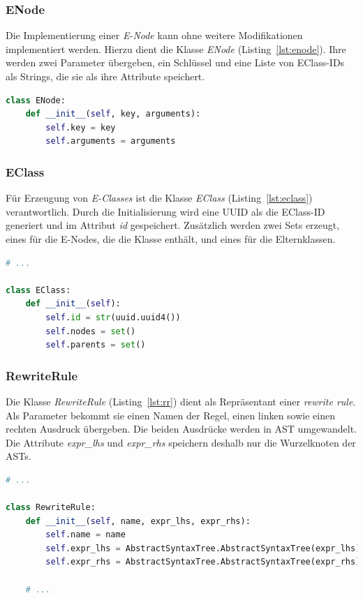 \subsubsection{ENode}

Die Implementierung einer \textit{E-Node} kann ohne weitere Modifikationen implementiert werden. Hierzu dient die Klasse \textit{ENode} (Listing~\ref{lst:enode}).
Ihre werden zwei Parameter übergeben, ein Schlüssel und eine Liste von EClass-IDs als Strings, die sie als ihre Attribute speichert.

\begin{lstlisting}[language=Python, caption=Klasse \textit{ENode}, label={lst:enode}]
class ENode:
    def __init__(self, key, arguments):
        self.key = key
        self.arguments = arguments
\end{lstlisting}

\subsubsection{EClass}

Für Erzeugung von \textit{E-Classes} ist die Klasse \textit{EClass} (Listing~\ref{lst:eclass}) verantwortlich. Durch die Initialisierung wird eine UUID als die EClass-ID generiert 
und im Attribut \textit{id} gespeichert. Zusätzlich werden zwei Sets erzeugt, eines für die E-Nodes, die die Klasse enthält, und eines für die Elternklassen.

\begin{lstlisting}[language=Python, caption=Klasse \textit{EClass}, label={lst:eclass}]
# ... 

class EClass:
    def __init__(self):
        self.id = str(uuid.uuid4())
        self.nodes = set()
        self.parents = set()
\end{lstlisting}

\subsubsection{RewriteRule}

Die Klasse \textit{RewriteRule} (Listing~\ref{lst:rr}) dient als Repräsentant einer \textit{rewrite rule}. Als Parameter bekommt sie einen Namen der Regel, einen linken sowie einen 
rechten Ausdruck übergeben. Die beiden Ausdrücke werden in AST umgewandelt. Die Attribute \textit{expr\_lhs} und \textit{expr\_rhs} speichern deshalb nur die Wurzelknoten der ASTs.

\begin{lstlisting}[language=Python, caption=Klasse \textit{RewriteRule}, label={lst:rr}]
# ... 

class RewriteRule:
    def __init__(self, name, expr_lhs, expr_rhs):
        self.name = name
        self.expr_lhs = AbstractSyntaxTree.AbstractSyntaxTree(expr_lhs)
        self.expr_rhs = AbstractSyntaxTree.AbstractSyntaxTree(expr_rhs)

    # ... 
\end{lstlisting}

